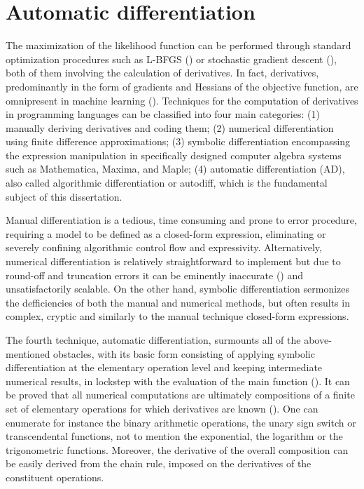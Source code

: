 \documentclass{pracamgr}
\numberwithin{equation}{section}
\begin{document}
\section{Automatic differentiation}

The maximization of the likelihood function can be performed through standard optimization procedures such as L-BFGS (\citet{zhu1997algorithm}) or stochastic gradient descent (\citet{bottou2010large}), both of them involving the calculation of derivatives. In fact, derivatives, predominantly in the form of gradients and Hessians of the objective function, are omnipresent in machine learning (\citet{sra2011introduction}). Techniques for the computation of derivatives in programming languages can be classified into four main categories: (1) manually deriving derivatives and coding them; (2) numerical differentiation using finite difference approximations; (3) symbolic differentiation encompassing the expression manipulation in specifically designed computer algebra systems such as Mathematica, Maxima, and Maple; (4) automatic differentiation (AD), also called algorithmic differentiation or autodiff, which is the fundamental subject of this dissertation. 

Manual differentiation is a tedious, time consuming and prone to error procedure, requiring a model to be defined as a closed-form expression, eliminating or severely confining algorithmic control flow and expressivity. Alternatively, numerical differentiation is relatively straightforward to implement but due to round-off and truncation errors it can be eminently inaccurate (\citet{jerrell1997automatic}) and unsatisfactorily scalable. On the other hand, symbolic differentiation sermonizes the defficiencies of both the manual and numerical methods, but often results in complex, cryptic and similarly to the manual technique closed-form expressions.

The fourth technique, automatic differentiation, surmounts all of the above-mentioned obstacles, with its basic form consisting of applying symbolic differentiation at the elementary operation level and keeping intermediate numerical results, in lockstep with the evaluation of the main function (\citet{baydin2018automatic}). It can be proved that all numerical computations are ultimately compositions of a finite set of elementary operations for which derivatives are known (\citet{griewank2008evaluating}). One can enumerate for instance the binary arithmetic operations, the unary sign switch or transcendental functions, not to mention the exponential, the logarithm or the trigonometric functions. Moreover, the derivative of the overall composition can be easily derived from the chain rule, imposed on the derivatives of the constituent operations.
\end{document}
